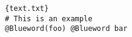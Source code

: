 \documentclass{article}
\begin{document}
\begin{lstlisting}[style=mybash]{text.txt}
# This is an example
@Blueword(foo) @Blueword bar
\end{lstlisting}
\end{document}
